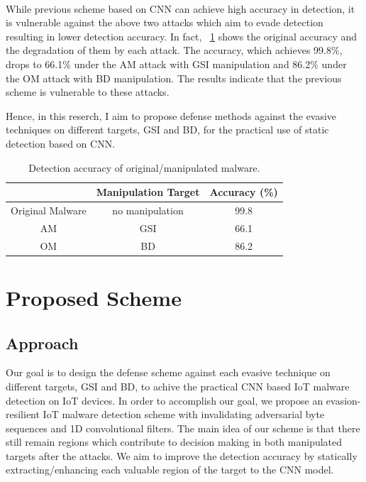 \documentclass{ieeeaccess}
\begin{document}
\paragraph*{}
While previous scheme based on CNN can achieve high accuracy in detection, it is vulnerable against the above two attacks which aim to evade detection resulting in lower detection accuracy.
In fact, \tablename~\ref{tab:prev} shows the original accuracy and the degradation of them by each attack.
The accuracy, which achieves 99.8\%, drops to 66.1\% under the AM attack with GSI manipulation and 86.2\% under the OM attack with BD manipulation.
The results indicate that the previous scheme is vulnerable to these attacks.

Hence, in this reserch, I aim to propose defense methods against the evasive techniques on different targets, GSI and BD, for the practical use of static detection based on CNN.

\begin{table}[h]
  \begin{center}
    \caption{Detection accuracy of original/manipulated malware.}
    \label{tab:prev} 
    \begin{tabular}{|c|c|c|} \hline
       & Manipulation Target & Accuracy (\%) \\ \hline \hline
      Original Malware & no manipulation  & 99.8  \\ \hline
      AM & GSI & 66.1  \\ \hline 
      OM & BD & 86.2 \\ \hline
    \end{tabular}
  \end{center}
\end{table} 

\section{Proposed Scheme} \label{sec:proposed_scheme}
\subsection{Approach}
Our goal is to design the defense scheme against each evasive technique on different targets, GSI and BD, to achive the practical CNN based IoT malware detection on IoT devices.
In order to accomplish our goal, we propose an evasion-resilient IoT malware detection scheme with invalidating adversarial byte sequences and 1D convolutional filters.  
The main idea of our scheme is that there still remain regions which contribute to decision making in both manipulated targets after the attacks.
We aim to improve the detection accuracy by statically extracting/enhancing each valuable region of the target to the CNN model.
\end{document}
